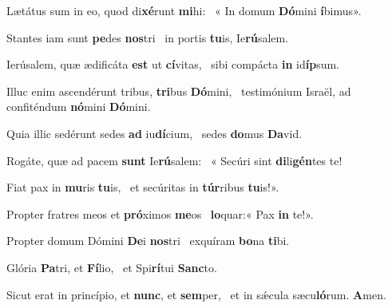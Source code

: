 \item Lætátus sum in eo, quod di\textbf{xé}runt \textbf{mi}hi:~\psstar{} « In domum \textbf{Dó}mini \textbf{í}bimus».

\item Stantes iam sunt \textbf{pe}des \textbf{nos}tri~\psstar{} in portis \textbf{tu}is, Ie\textbf{rú}salem.

\item Ierúsalem, quæ ædificáta \textbf{est} ut \textbf{cí}vitas,~\psstar{} sibi compácta \textbf{in} id\textbf{íp}sum.

\item Illuc enim ascendérunt tribus, \textbf{tri}bus \textbf{Dó}mini,~\psstar{} testimónium Israël, ad confiténdum \textbf{nó}mini \textbf{Dó}mini.

\item Quia illic sedérunt sedes \textbf{ad} iu\textbf{dí}cium,~\psstar{} sedes \textbf{do}mus \textbf{Da}vid.

\item Rogáte, quæ ad pacem \textbf{sunt} Ie\textbf{rú}salem:~\psstar{} « Secúri sint \textbf{di}li\textbf{gén}tes te!

\item Fiat pax in \textbf{mu}ris \textbf{tu}is,~\psstar{} et secúritas in \textbf{túr}ribus \textbf{tu}is!».

\item Propter fratres meos et \textbf{pró}ximos \textbf{me}os~\psstar{} \textbf{lo}quar:« Pax \textbf{in} te!».

\item Propter domum Dómini \textbf{De}i \textbf{nos}tri~\psstar{} exquíram \textbf{bo}na \textbf{ti}bi.

\item Glória \textbf{Pa}tri, et \textbf{Fí}lio,~\psstar{} et Spi\textbf{rí}tui \textbf{Sanc}to.

\item Sicut erat in princípio, et \textbf{nunc}, et \textbf{sem}per,~\psstar{} et in sǽcula sæcu\textbf{ló}rum. \textbf{A}men.